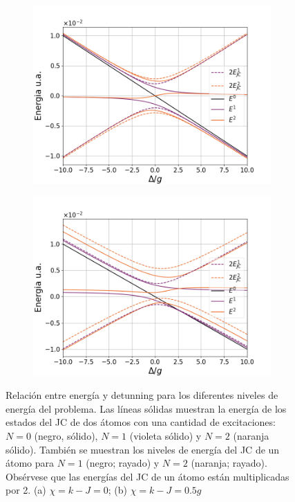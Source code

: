 \begin{figure}
    \centering
    \begin{subfigure}[h]{0.49\textwidth}
        \centering
        \includegraphics[width=\textwidth]{figuras/ch4/energias 0.png}
        \caption{}
        \label{fig:relación energia detunning 1}
    \end{subfigure}
    \hfill
    \begin{subfigure}[h]{0.49\textwidth}
        \centering
        \includegraphics[width=\textwidth]{figuras/ch4/energias 0.5.png}
        \caption{}
        \label{fig:relación energia detunning 2}
    \end{subfigure}
       \caption{Relación entre energía y detunning para los diferentes niveles de energía del problema. Las líneas sólidas muestran la energía de los estados del JC de dos átomos con una cantidad de excitaciones: $N=0$ (negro, sólido), $N=1$ (violeta sólido) y $N=2$ (naranja sólido). También se muestran los niveles de energía del JC de un átomo para $N=1$ (negro; rayado) y $N=2$ (naranja; rayado). Obsérvese que las energías del JC de un átomo están multiplicadas por 2. (a) $\chi=k-J=0$; (b) $\chi=k-J=0.5g$}
       \label{fig:relación energia detunning}
\end{figure}
